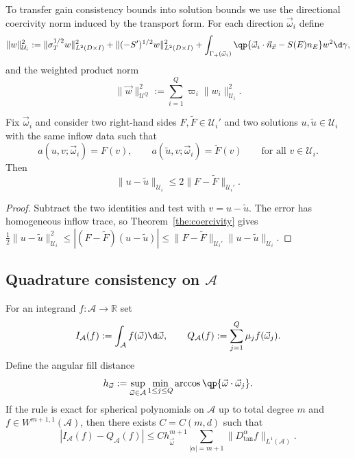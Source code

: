\documentclass[final]{amsart}
\begin{document}
To transfer gain consistency bounds into solution bounds we use the
directional coercivity norm induced by the transport form. For each
direction $\vec{\omega}_i$ define
\[
  \|w\|_{\mathcal U_i}^2
  :=
  \|\sigma_T^{1/2}w\|_{L^2(D\times I)}^2
  + \|(-S')^{1/2}w\|_{L^2(D\times I)}^2
  + \int_{\Gamma_+(\vec{\omega}_i)}
  \qp{\vec{\omega}_i\cdot\vec{n}_{\vec x}-S(E)n_E} w^2 \d\gamma,
\]
and the weighted product norm
\[
  \|\vec w\|_{\mathcal U^Q}^2 := \sum_{i=1}^Q \varpi_i \|w_i\|_{\mathcal U_i}^2.
\]

\begin{lemma}
\label{lem:directional-stability}
Fix $\vec{\omega}_i$ and consider two right-hand sides
$F,\widetilde F\in \mathcal U_i'$ and two solutions
$u,\widetilde u\in\mathcal U_i$ with the same inflow data such that
\[
  a(u,v;\vec{\omega}_i)=F(v),
  \qquad
  a(\widetilde u,v;\vec{\omega}_i)=\widetilde F(v)
  \qquad \text{for all } v\in \mathcal U_i.
\]
Then
\[
  \|u-\widetilde u\|_{\mathcal U_i}
  \le
  2 \|F-\widetilde F\|_{\mathcal U_i'}.
\]
\end{lemma}

\begin{proof}
Subtract the two identities and test with $v=u-\widetilde u$. The error
has homogeneous inflow trace, so Theorem~\ref{the:coercivity} gives
$\tfrac12\|u-\widetilde u\|_{\mathcal U_i}^2
\le |(F-\widetilde F)(u-\widetilde u)|\le
\|F-\widetilde F\|_{\mathcal U_i'}\|u-\widetilde u\|_{\mathcal U_i}$.
\end{proof}

\subsection{Quadrature consistency on $\mathcal A$}
\label{subsec:errorcontrol-quadrature}

For an integrand $f:\mathcal A\to\mathbb R$ set
\[
  I_{\mathcal A}(f):=\int_{\mathcal A} f(\vec\omega) \d\vec\omega,
  \qquad
  Q_{\mathcal A}(f):=\sum_{j=1}^Q \mu_j f(\vec\omega_j).
\]
Define the angular fill distance
\[
  h_{\vec\omega}
  :=
  \sup_{\vec{\omega}\in\mathcal A}\min_{1\le j\le Q}
  \arccos\qp{\vec{\omega}\cdot\vec{\omega}_j}.
\]
If the rule is exact for spherical polynomials on $\mathcal A$ up to
total degree $m$ and $f\in W^{m+1,1}(\mathcal A)$, then there exists
$C=C(m,d)$ such that
\begin{equation}
  \label{eq:quad-error}
  |I_{\mathcal A}(f)-Q_{\mathcal A}(f)|
  \le
  C h_{\vec\omega}^{m+1}
  \sum_{|\alpha|=m+1}\|D_{\tan}^\alpha f\|_{L^1(\mathcal A)}.
\end{equation}
\end{document}
